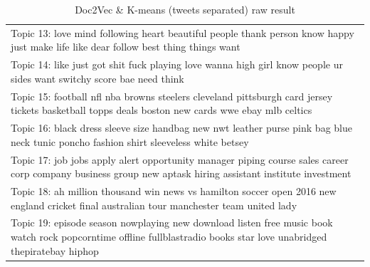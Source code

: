 \documentclass[11pt]{article}
\begin{document}
\begin{appendices}
\begin{table}[H]
\begin{tabular}{|p{\linewidth}|}
    Topic 13: love mind following heart beautiful people thank person know happy just make life like dear follow best thing things want\\
    Topic 14: like just got shit fuck playing love wanna high girl know people ur sides want switchy score bae need think\\
    Topic 15: football nfl nba browns steelers cleveland pittsburgh card jersey tickets basketball topps deals boston new cards wwe ebay mlb celtics\\
    Topic 16: black dress sleeve size handbag new nwt leather purse pink bag blue neck tunic poncho fashion shirt sleeveless white betsey\\
    Topic 17: job jobs apply alert opportunity manager piping course sales career corp company business group new aptask hiring assistant institute investment\\
    Topic 18: ah million thousand win news vs hamilton soccer open 2016 new england cricket final australian tour manchester team united lady\\
    Topic 19: episode season nowplaying new download listen free music book watch rock popcorntime offline fullblastradio books star love unabridged thepiratebay hiphop\\
    \hline
    \end{tabular}
	\caption{Doc2Vec \& K-means (tweets separated) raw result}
	\label{tb:res_doc_sep_raw}
\end{table}


\end{appendices}
\end{document}
